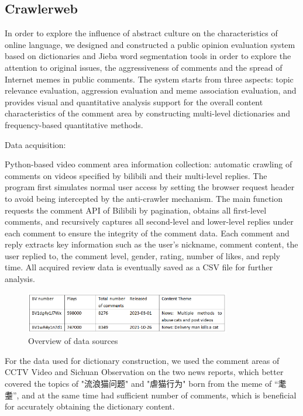\documentclass[12pt,a4paper]{ctexart}
\begin{document}
\subsection{Crawlerweb}

In order to explore the influence of abstract culture on the characteristics of online language, we designed and constructed a public opinion evaluation system based on dictionaries and Jieba word segmentation tools in order to explore the attention to original issues, the aggressiveness of comments and the spread of Internet memes in public comments. The system starts from three aspects: topic relevance evaluation, aggression evaluation and meme association evaluation, and provides visual and quantitative analysis support for the overall content characteristics of the comment area by constructing multi-level dictionaries and frequency-based quantitative methods.

Data acquisition:

Python-based video comment area information collection: automatic crawling of comments on videos specified by bilibili and their multi-level replies. The program first simulates normal user access by setting the browser request header to avoid being intercepted by the anti-crawler mechanism. The main function requests the comment API of Bilibili by pagination, obtains all first-level comments, and recursively captures all second-level and lower-level replies under each comment to ensure the integrity of the comment data. Each comment and reply extracts key information such as the user's nickname, comment content, the user replied to, the comment level, gender, rating, number of likes, and reply time. All acquired review data is eventually saved as a CSV file for further analysis.

\begin{figure}[htbp]
    \centering
    \includegraphics[width=0.8\textwidth]{img/data_sources_1.png}
    \caption{Overview of data sources}
    \label{fig:data_sources_1}
\end{figure}
\newpage

For the data used for dictionary construction, we used the comment areas of CCTV Video and Sichuan Observation on the two news reports, which better covered the topics of "流浪猫问题" and "虐猫行为" born from the meme of “耄耋”, and at the same time had sufficient number of comments, which is beneficial for accurately obtaining the dictionary content.
\end{document}
